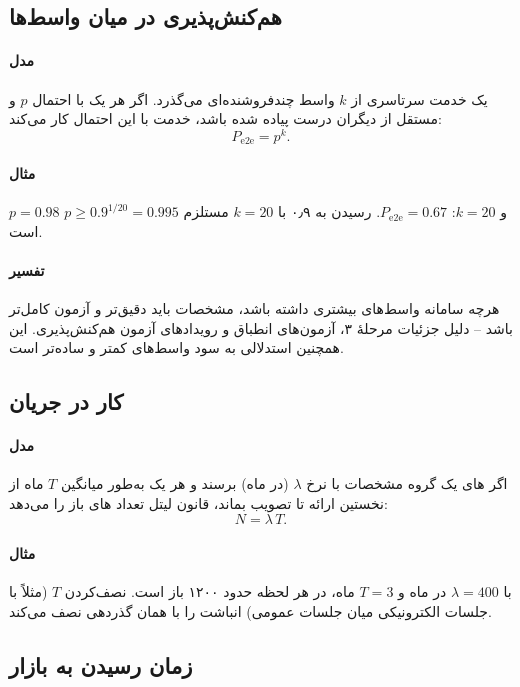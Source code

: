 \documentclass[11pt,a4paper]{article}
\begin{document}
\subsection{هم‌کنش‌پذیری در میان واسط‌ها}\label{sec:interop}
\paragraph{مدل} یک خدمت سرتاسری از $k$ واسط چندفروشنده‌ای می‌گذرد. اگر هر یک با احتمال $p$ و مستقل از دیگران درست پیاده
شده باشد، خدمت با این احتمال کار می‌کند:
\begin{equation}\label{eq:interop}
  P_{\mathrm{e2e}} = p^{k}.
\end{equation}
\paragraph{مثال} $p = 0.98$ و $k = 20$: $P_{\mathrm{e2e}} = 0.67$. رسیدن به ۰٫۹ با $k = 20$ مستلزم $p \ge 0.9^{1/20} = 0.995$
است.
\paragraph{تفسیر} هرچه سامانه واسط‌های بیشتری داشته باشد، مشخصات باید دقیق‌تر و آزمون کامل‌تر باشد -- دلیل جزئیات مرحلهٔ ۳،
آزمون‌های انطباق و رویدادهای آزمون هم‌کنش‌پذیری. این همچنین استدلالی به سود واسط‌های کمتر و ساده‌تر است.

\subsection{کار در جریان}\label{sec:little}
\paragraph{مدل} اگر های یک گروه مشخصات با نرخ $\lambda$ (در ماه) برسند و هر یک به‌طور میانگین $T$ ماه از نخستین ارائه
تا تصویب بماند، قانون لیتل تعداد های باز را می‌دهد:
\begin{equation}\label{eq:little}
  N = \lambda\,T .
\end{equation}
\paragraph{مثال} با $\lambda = 400$  در ماه و $T = 3$ ماه، در هر لحظه حدود ۱۲۰۰  باز است. نصف‌کردن $T$ (مثلاً
با جلسات الکترونیکی میان جلسات عمومی) انباشت را با همان گذردهی نصف می‌کند.

\subsection{زمان رسیدن به بازار}\label{sec:ttm}
\end{document}
